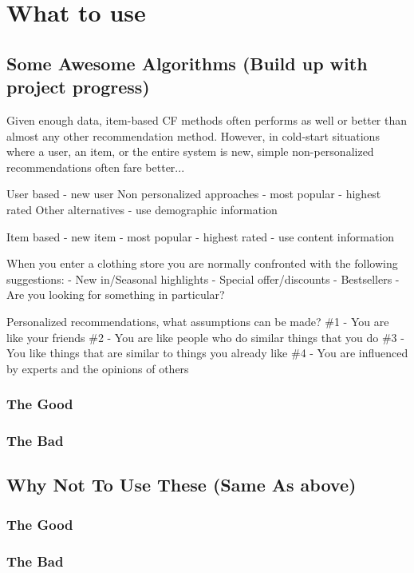 
\section{What to use}




\subsection{Some Awesome Algorithms (Build up with project progress)}

Given enough data, item-based CF methods often performs as well or better than
almost any other recommendation method. However, in cold-start situations where
a user, an item, or the entire system is new, simple non-personalized
recommendations often fare better...

User based - new user
Non personalized approaches
    - most popular
    - highest rated
Other alternatives
    - use demographic information

Item based - new item
    - most popular
    - highest rated
    - use content information

When you enter a clothing store you are normally confronted with the following suggestions:
    - New in/Seasonal highlights
    - Special offer/discounts
    - Bestsellers
    - Are you looking for something in particular?

Personalized recommendations, what assumptions can be made?
\#1 - You are like your friends
\#2 - You are like people who do similar things that you do
\#3 - You like things that are similar to things you already like
\#4 - You are influenced by experts and the opinions of others

\subsubsection{The Good}
\subsubsection{The Bad}
\subsection{Why Not To Use These (Same As above)}
\subsubsection{The Good}
\subsubsection{The Bad}

